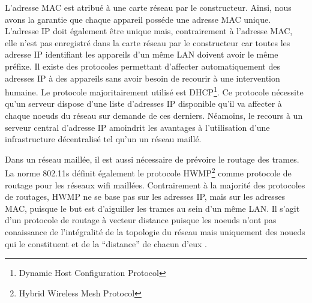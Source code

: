 L'adresse MAC est atribué à une carte réseau par le constructeur. Ainsi, nous avons la garantie que chaque appareil posséde une
adresse MAC unique. L'adresse IP doit également être unique mais, contrairement à l'adresse MAC, elle n'est pas enregistré dans
la carte réseau par le constructeur car toutes les adresse IP identifiant les appareils d'un même LAN doivent avoir le même 
préfixe. Il existe des protocoles permettant d'affecter automatiquement des adresses IP à des appareils sans avoir besoin de
recourir à une intervention humaine. Le protocole majoritairement utilisé est DHCP\footnote{Dynamic Host Configuration 
Protocol}. Ce protocole nécessite qu'un serveur dispose d'une liste d'adresses IP disponible qu'il va affecter à chaque noeuds
du réseau sur demande de ces derniers\cite{DHCP}. Néamoins, le recours à un serveur central d'adresse IP amoindrit les 
avantages à l'utilisation d'une infrastructure décentralisé tel qu'un un réseau maillé.

Dans un réseau maillée, il est aussi nécessaire de prévoire le routage des trames. La norme 802.11s définit également le protocole
HWMP\footnote{Hybrid Wireless Mesh Protocol} comme protocole de routage pour les réseaux wifi maillées. Contrairement à la majorité 
des protocoles de routages, HWMP ne se base pas sur les adresses IP, mais sur les adresses MAC, puisque le but est d'aiguiller
les trames au sein d'un même LAN. Il s'agit d'un protocole de routage à vecteur distance puisque les noeuds n'ont pas conaissance
de l'intégralité de la topologie du réseau mais uniquement des noueds qui le constituent et de la ``distance'' de chacun d'eux
\cite{MNroute}.
